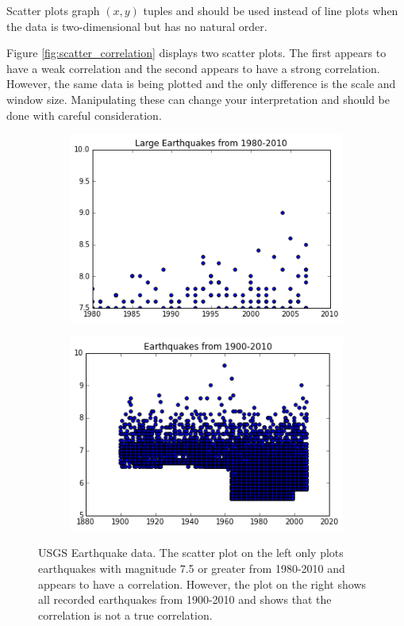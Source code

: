 Scatter plots graph $(x,y)$ tuples and should be used instead of line plots when the data is two-dimensional but has no natural order.

Figure \ref{fig:scatter_correlation} displays two scatter plots.
The first appears to have a weak correlation and the second appears to have a strong correlation.
However, the same data is being plotted and the only difference is the scale and window size.
Manipulating these can change your interpretation and should be done with careful consideration.

\begin{figure}[h]
\centering
\begin{subfigure}{.45\textwidth}
\centering
\includegraphics[width=\textwidth]{earthquake_zoomed.png}
\end{subfigure}
\begin{subfigure}{.45\textwidth}
\centering
\includegraphics[width=\textwidth]{earthquake_data.png}
\end{subfigure}
\caption{USGS Earthquake data. The scatter plot on the left only plots earthquakes with
magnitude 7.5 or greater from 1980-2010 and appears to have a correlation. 
However, the plot on the right shows all recorded earthquakes from 1900-2010 and shows that the correlation
is not a true correlation.}
\label{fig:scatterquake}
\end{figure}

